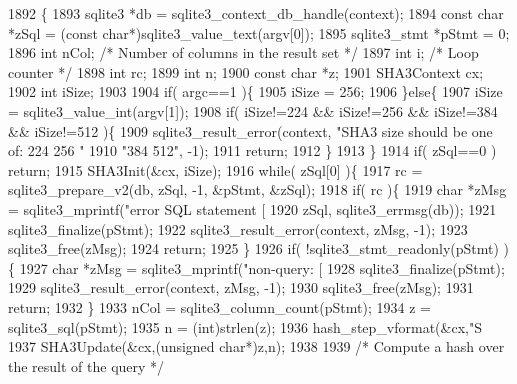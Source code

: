 \begin{DoxyCode}
1892  \{
1893   sqlite3 *db = sqlite3_context_db_handle(context);
1894   \textcolor{keyword}{const} \textcolor{keywordtype}{char} *zSql = (\textcolor{keyword}{const} \textcolor{keywordtype}{char}*)sqlite3_value_text(argv[0]);
1895   sqlite3_stmt *pStmt = 0;
1896   \textcolor{keywordtype}{int} nCol;                   \textcolor{comment}{/* Number of columns in the result set */}
1897   \textcolor{keywordtype}{int} i;                      \textcolor{comment}{/* Loop counter */}
1898   \textcolor{keywordtype}{int} rc;
1899   \textcolor{keywordtype}{int} n;
1900   \textcolor{keyword}{const} \textcolor{keywordtype}{char} *z;
1901   SHA3Context cx;
1902   \textcolor{keywordtype}{int} iSize;
1903 
1904   \textcolor{keywordflow}{if}( argc==1 )\{
1905     iSize = 256;
1906   \}\textcolor{keywordflow}{else}\{
1907     iSize = sqlite3_value_int(argv[1]);
1908     \textcolor{keywordflow}{if}( iSize!=224 && iSize!=256 && iSize!=384 && iSize!=512 )\{
1909       sqlite3_result_error(context, \textcolor{stringliteral}{"SHA3 size should be one of: 224 256 "}
1910                                     \textcolor{stringliteral}{"384 512"}, -1);
1911       \textcolor{keywordflow}{return};
1912     \}
1913   \}
1914   \textcolor{keywordflow}{if}( zSql==0 ) \textcolor{keywordflow}{return};
1915   SHA3Init(&cx, iSize);
1916   \textcolor{keywordflow}{while}( zSql[0] )\{
1917     rc = sqlite3_prepare_v2(db, zSql, -1, &pStmt, &zSql);
1918     \textcolor{keywordflow}{if}( rc )\{
1919       \textcolor{keywordtype}{char} *zMsg = sqlite3_mprintf(\textcolor{stringliteral}{"error SQL statement [%
1920                                    zSql, sqlite3_errmsg(db));
1921       sqlite3_finalize(pStmt);
1922       sqlite3_result_error(context, zMsg, -1);
1923       sqlite3_free(zMsg);
1924       \textcolor{keywordflow}{return};
1925     \}
1926     \textcolor{keywordflow}{if}( !sqlite3_stmt_readonly(pStmt) )\{
1927       \textcolor{keywordtype}{char} *zMsg = sqlite3_mprintf(\textcolor{stringliteral}{"non-query: [%
1928       sqlite3_finalize(pStmt);
1929       sqlite3_result_error(context, zMsg, -1);
1930       sqlite3_free(zMsg);
1931       \textcolor{keywordflow}{return};
1932     \}
1933     nCol = sqlite3_column_count(pStmt);
1934     z = sqlite3_sql(pStmt);
1935     n = (int)strlen(z);
1936     hash_step_vformat(&cx,\textcolor{stringliteral}{"S%
1937     SHA3Update(&cx,(\textcolor{keywordtype}{unsigned} \textcolor{keywordtype}{char}*)z,n);
1938 
1939     \textcolor{comment}{/* Compute a hash over the result of the query */}
}}}
\end{DoxyCode}
